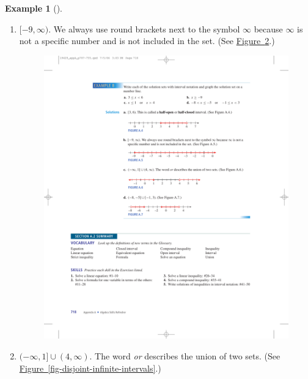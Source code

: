\documentclass[10pt,]{book}
\theoremstyle{plain}
\theoremstyle{definition}
\theoremstyle{definition}
\newtheorem{example}[theorem]{Example}
\theoremstyle{definition}
\numberwithin{equation}{part}
\begin{document}
\begin{example}[]
\begin{enumerate}[label=*\alph**]
\begin{figure}
\caption{\label{fig-half-open-interval}}
\end{figure}
%
\item\hypertarget{li-124}{}\([−9,\infty)\). We always use round brackets next to the symbol \(\infty\) because \(\infty\) is not a specific number and is not included in the set. (See \hyperref[fig-half-closed-infinite-interval]{Figure~\ref{fig-half-closed-infinite-interval}}.) \leavevmode%
\begin{figure}
\centering
\includegraphics[width=1\linewidth]{images/fig-half-closed-infinite-interval}
\caption{\label{fig-half-closed-infinite-interval}}
\end{figure}
%
\item\hypertarget{li-125}{}\((−\infty, 1] \cup (4, \infty)\). The word \emph{or} describes the union of two sets. (See \hyperref[fig-disjoint-infinite-intervals]{Figure~\ref{fig-disjoint-infinite-intervals}}.) \leavevmode%
\begin{figure}
\centering

\end{figure}
\end{enumerate}
\end{example}
\end{document}
